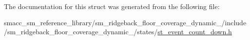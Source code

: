 The documentation for this struct was generated from the following file\+:\begin{DoxyCompactItemize}
\item 
smacc\+\_\+sm\+\_\+reference\+\_\+library/sm\+\_\+ridgeback\+\_\+floor\+\_\+coverage\+\_\+dynamic\+\_/include/sm\+\_\+ridgeback\+\_\+floor\+\_\+coverage\+\_\+dynamic\+\_/states/\hyperlink{sm__ridgeback__floor__coverage__dynamic__1_2include_2sm__ridgeback__floor__coverage__dynamic__1_026a8bc52390bce786f0a52749687d29}{st\+\_\+event\+\_\+count\+\_\+down.\+h}\end{DoxyCompactItemize}
